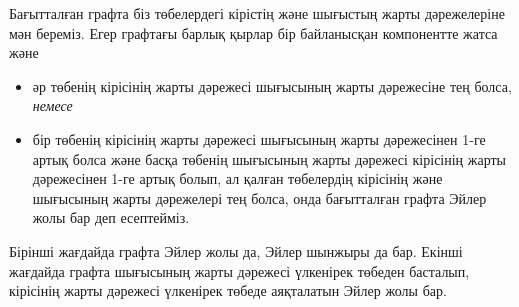 Бағытталған графта біз төбелердегі кірістің және
шығыстың жарты дәрежелеріне мән береміз.
Егер графтағы барлық қырлар
бір байланысқан компонентте жатса және
\begin{itemize}
\item әр төбенің кірісінің жарты дәрежесі шығысының жарты дәрежесіне тең болса,
\emph{немесе}
\item бір төбенің кірісінің жарты дәрежесі шығысының жарты дәрежесінен 
1-ге артық болса және басқа төбенің шығысының жарты дәрежесі 
кірісінің жарты дәрежесінен 1-ге
артық болып, ал қалған төбелердің кірісінің және шығысының жарты
дәрежелері тең болса, онда бағытталған графта Эйлер жолы бар деп есептейміз. 
\end{itemize}

Бірінші жағдайда графта Эйлер жолы да, Эйлер шынжыры да бар.
Екінші жағдайда графта шығысының жарты дәрежесі үлкенірек төбеден басталып, кірісінің жарты дәрежесі үлкенірек төбеде аяқталатын Эйлер жолы бар.

